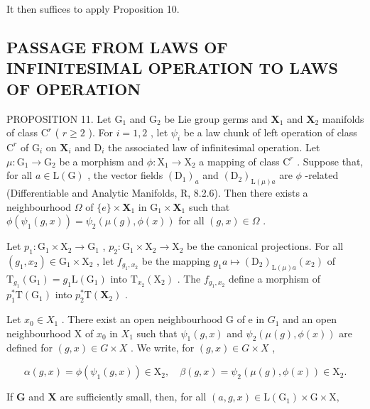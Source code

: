 It then suffices to apply Proposition 10.

\subsection{PASSAGE FROM LAWS OF INFINITESIMAL OPERATION TO LAWS OF OPERATION}

PROPOSITION 11. Let \(\mathrm{G}_1\) and \(\mathrm{G}_2\) be Lie group germs and \(\mathbf{X}_1\) and \(\mathbf{X}_2\) manifolds of class \(\mathrm{C}^r\) ( \(r \geqslant 2\) ). For \(i = 1, 2\) , let \(\psi_i\) be a law chunk of left operation of class \(\mathrm{C}^r\) of \(\mathrm{G}_i\) on \(\mathbf{X}_i\) and \(\mathrm{D}_i\) the associated law of infinitesimal operation. Let \(\mu: \mathrm{G}_1 \to \mathrm{G}_2\) be a morphism and \(\phi: \mathrm{X}_1 \to \mathrm{X}_2\) a mapping of class \(\mathrm{C}^r\) . Suppose that, for all \(a \in \mathrm{L}(\mathrm{G})\) , the vector fields \((\mathrm{D}_{1})_a\) and \((\mathrm{D}_{2})_{\mathrm{L}(\mu)a}\) are \(\phi\) -related (Differentiable and Analytic Manifolds, R, 8.2.6). Then there exists a neighbourhood \(\Omega\) of \(\{e\} \times \mathbf{X}_1\) in \(\mathrm{G}_1 \times \mathbf{X}_1\) such that \(\phi(\psi_1(g,x)) = \psi_2(\mu(g),\phi(x))\) for all \((g,x) \in \Omega\) .

Let \(p_1: \mathrm{G}_1 \times \mathrm{X}_2 \to \mathrm{G}_1\) , \(p_2: \mathrm{G}_1 \times \mathrm{X}_2 \to \mathrm{X}_2\) be the canonical projections. For all \((g_1, x_2) \in \mathrm{G}_1 \times \mathrm{X}_2\) , let \(f_{g_1, x_2}\) be the mapping \(g_1 a \mapsto (\mathrm{D}_2)_{\mathrm{L}(\mu)a}(x_2)\) of \(\mathrm{T}_{g_1}(\mathrm{G}_1) = g_1\mathrm{L}(\mathrm{G}_1)\) into \(\mathrm{T}_{x_2}(\mathrm{X}_2)\) . The \(f_{g_1, x_2}\) define a morphism of \(p_1^* \mathrm{T}(\mathrm{G}_1)\) into \(p_2^* \mathrm{T}(\mathbf{X}_2)\) .

Let \(x_0 \in X_1\) . There exist an open neighbourhood G of e in \(G_1\) and an open neighbourhood X of \(x_0\) in \(X_1\) such that \(\psi_1(g, x)\) and \(\psi_2(\mu(g), \phi(x))\) are defined for \((g, x) \in G \times X\) . We write, for \((g, x) \in G \times X\) ,

\[
\alpha (g, x) = \phi (\psi_ {1} (g, x)) \in \mathrm{X} _ {2}, \quad \beta (g, x) = \psi_ {2} (\mu (g), \phi (x)) \in \mathrm{X} _ {2}.
\]

If \(\mathbf{G}\) and \(\mathbf{X}\) are sufficiently small, then, for all \((a,g,x)\in \mathrm{L}(\mathrm{G}_1)\times \mathrm{G}\times \mathrm{X},\)

